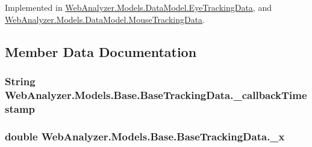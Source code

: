 Implemented in \hyperlink{class_web_analyzer_1_1_models_1_1_data_model_1_1_eye_tracking_data_a1c9442c2b205d50095519102069ad2cd}{Web\+Analyzer.\+Models.\+Data\+Model.\+Eye\+Tracking\+Data}, and \hyperlink{class_web_analyzer_1_1_models_1_1_data_model_1_1_mouse_tracking_data_ac1af00e598088574f90d7431888af2e3}{Web\+Analyzer.\+Models.\+Data\+Model.\+Mouse\+Tracking\+Data}.



\subsection{Member Data Documentation}
\hypertarget{class_web_analyzer_1_1_models_1_1_base_1_1_base_tracking_data_a97cfad26e3a27a528776bcccbe7da68d}{}
\subsubsection[{\+\_\+callback\+Timestamp}]{\setlength{\rightskip}{0pt plus 5cm}String Web\+Analyzer.\+Models.\+Base.\+Base\+Tracking\+Data.\+\_\+callback\+Timestamp\hspace{0.3cm}{\ttfamily [protected]}}\label{class_web_analyzer_1_1_models_1_1_base_1_1_base_tracking_data_a97cfad26e3a27a528776bcccbe7da68d}
\hypertarget{class_web_analyzer_1_1_models_1_1_base_1_1_base_tracking_data_a38d492dc01a8dbba23ec635874808081}{}
\subsubsection[{\+\_\+x}]{\setlength{\rightskip}{0pt plus 5cm}double Web\+Analyzer.\+Models.\+Base.\+Base\+Tracking\+Data.\+\_\+x\hspace{0.3cm}{\ttfamily [protected]}}\label{class_web_analyzer_1_1_models_1_1_base_1_1_base_tracking_data_a38d492dc01a8dbba23ec635874808081}
\hypertarget{class_web_analyzer_1_1_models_1_1_base_1_1_base_tracking_data_a435fc601a4a55e8ff46b1e42724cc269}{}
